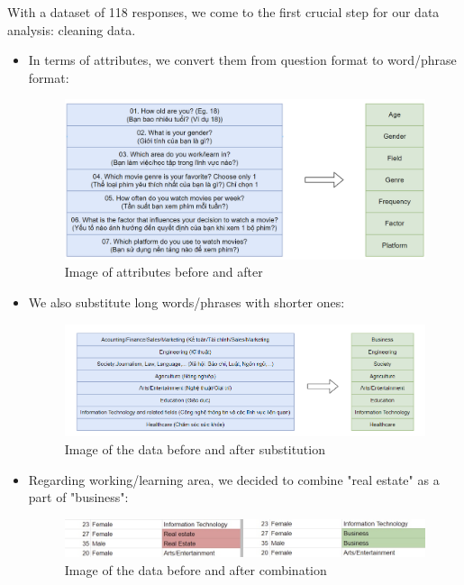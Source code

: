     With a dataset of 118 responses, we come to the first crucial step for our data analysis: cleaning data.
                \begin{itemize}
                    \item In terms of attributes, we convert them from question format to word/phrase format:
                        \begin{figure}[H]
                            \centering
                            \includegraphics[scale=0.45]{graphics/data/questiontophrase1.png}
                            \caption{Image of attributes before and after}
                        \end{figure}
                    
                    \item We also substitute long words/phrases with shorter ones:
                         \begin{figure}[H]
                            \centering
                            \includegraphics[scale=0.65]{graphics/data/substi.png}
                            \caption{Image of the data before and after substitution}
                        \end{figure}

                    \item Regarding working/learning area,  we decided to combine "real estate" as a part of "business":
                        \begin{figure}[H]
                            \centering
                            \includegraphics[scale=0.5]{graphics/data/realestate_business.jpg}
                            \caption{Image of the data before and after combination}
                        \end{figure}
                    

\end{itemize}
